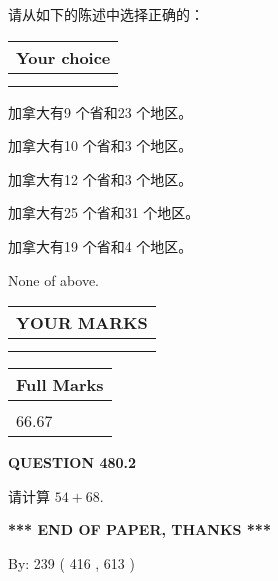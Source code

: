 \documentclass{ctexart}
\begin{document}
  
请从如下的陈述中选择正确的：
  
  
\noindent\hspace{3.0in} \begin{tabular}{|l|}
\hline
Your choice \\
\hline
 \\ 
 \\ 
\hline
\end{tabular}
  
  
 
 
加拿大有9 个省和23 个地区。
 
 
加拿大有10 个省和3 个地区。
 
 
加拿大有12 个省和3 个地区。
 
 
加拿大有25 个省和31 个地区。
 
 
加拿大有19 个省和4 个地区。
 
 
 None of above.
 
 
  
\vspace{0.2in}
  
\noindent\begin{tabular}{|l|}
\hline
 YOUR MARKS  \\
\hline
 \\ 
 \\ 
\hline
\end{tabular}
\hspace{0.05in} \begin{tabular}{|l|}
\hline
 Full Marks  \\
\hline
 \\ 
66.67 \\
\hline
\end{tabular}
{\textbf{\Large{QUESTION
480.2 
}}}
  
  
 
请计算 $ %
54 +  %
68 $.
 

 

 
   
   
 \vspace{0.2in}
 
   
   
   
   
\vspace{1.0in} 
{\textbf{\large{ *** END OF PAPER, THANKS *** }}} 
   
   
\hspace{1.0in} By: 
 239 ( 416 ,  613 )
   
\end{document}
